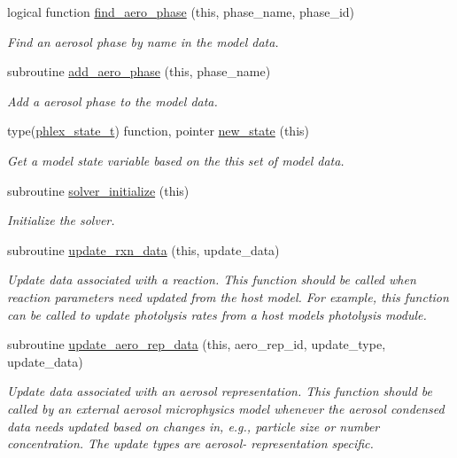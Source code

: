 \begin{DoxyCompactItemize}
logical function \mbox{\hyperlink{namespacepmc__phlex__core_a3405caf8619aee5c8c8b485a7c4656c7}{find\+\_\+aero\+\_\+phase}} (this, phase\+\_\+name, phase\+\_\+id)
\begin{DoxyCompactList}\small\item\em Find an aerosol phase by name in the model data. \end{DoxyCompactList}\item 
subroutine \mbox{\hyperlink{namespacepmc__phlex__core_a0451072e828ba667d94da371f6651304}{add\+\_\+aero\+\_\+phase}} (this, phase\+\_\+name)
\begin{DoxyCompactList}\small\item\em Add a aerosol phase to the model data. \end{DoxyCompactList}\item 
type(\mbox{\hyperlink{structpmc__phlex__state_1_1phlex__state__t}{phlex\+\_\+state\+\_\+t}}) function, pointer \mbox{\hyperlink{namespacepmc__phlex__core_adffeba53035ef5016b6882ced639d412}{new\+\_\+state}} (this)
\begin{DoxyCompactList}\small\item\em Get a model state variable based on the this set of model data. \end{DoxyCompactList}\item 
subroutine \mbox{\hyperlink{namespacepmc__phlex__core_a9806ba5a2c2fec22d524fc375c55d03b}{solver\+\_\+initialize}} (this)
\begin{DoxyCompactList}\small\item\em Initialize the solver. \end{DoxyCompactList}\item 
subroutine \mbox{\hyperlink{namespacepmc__phlex__core_a18e09416ad550e977685ae0d76bf1f6a}{update\+\_\+rxn\+\_\+data}} (this, update\+\_\+data)
\begin{DoxyCompactList}\small\item\em Update data associated with a reaction. This function should be called when reaction parameters need updated from the host model. For example, this function can be called to update photolysis rates from a host model\textquotesingle{}s photolysis module. \end{DoxyCompactList}\item 
subroutine \mbox{\hyperlink{namespacepmc__phlex__core_a92ef5a71ae9f1520013e20dafd557b9c}{update\+\_\+aero\+\_\+rep\+\_\+data}} (this, aero\+\_\+rep\+\_\+id, update\+\_\+type, update\+\_\+data)
\begin{DoxyCompactList}\small\item\em Update data associated with an aerosol representation. This function should be called by an external aerosol microphysics model whenever the aerosol condensed data needs updated based on changes in, e.\+g., particle size or number concentration. The update types are aerosol-\/ representation specific. \end{DoxyCompactList}\item 

\end{DoxyCompactItemize}
